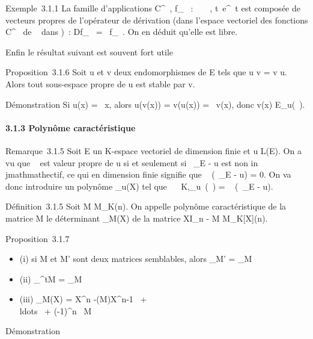 \documentclass[]{article}
\begin{document}
Exemple~3.1.1 La famille d'applications C^\infty~, f_\lambda~ : ~
\rightarrow~ , t\mapsto~e^\lambda~t est composée de
vecteurs propres de l'opérateur de dérivation (dans l'espace vectoriel
des fonctions C^\infty~ de ~ dans )~: Df_\lambda~ =
\lambda~f_\lambda~. On en déduit qu'elle est libre.

Enfin le résultat suivant est souvent fort utile

Proposition~3.1.6 Soit u et v deux endomorphismes de E tels que u \cdot v =
v \cdot u. Alors tout sous-espace propre de u est stable par v.

Démonstration Si u(x) = \lambda~x, alors u(v(x)) = v(u(x)) = \lambda~v(x), donc v(x) \in
E_u(\lambda~).

\paragraph{3.1.3 Polynôme caractéristique}

Remarque~3.1.5 Soit E un K-espace vectoriel de dimension finie et u \in
L(E). On a vu que \lambda~ est valeur propre de u si et seulement si
\lambda~\mathrmId_E - u est non in\\jmathmathectif, ce qui en
dimension finie signifie que
~
(\lambda~\mathrmId_E - u) = 0. On va donc
introduire un polynôme \chi_u(X) tel que
\forall~\lambda~ \in K,\chi_u~(\lambda~)
= ~
(\lambda~\mathrmId_E - u).

Définition~3.1.5 Soit M \in M_K(n). On appelle polynôme
caractéristique de la matrice M le déterminant \chi_M(X) de la
matrice XI_n - M \in M_K{[}X{]}(n).

Proposition~3.1.7

\begin{itemize}
\itemsep1pt\parskip0pt
\item
  (i) si M et M' sont deux matrices semblables, alors \chi_M' =
  \chi_M
\item
  (ii) \chi_^tM = \chi_M
\item
  (iii) \chi_M(X) = X^n
  -(M)X^n-1~
  + \\ldots~ +
  (-1)^n\
   M
\end{itemize}

Démonstration
\end{document}
